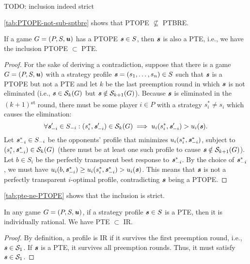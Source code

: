 \begin{remark}
	TODO: inclusion indeed strict
\end{remark}

\begin{remark}
	\autoref{tab:PTOPE-not-sub-sptbre} shows that PTOPE $\not\subseteq$ PTBRE.
\end{remark}

\begin{lemma}
	\label{th:ptope-subset-pte}
	If a game $G = (P, S, \boldsymbol{\mathit{u}})$ has a PTOPE $\boldsymbol{\mathit{s}} \in S$, then $\boldsymbol{\mathit{s}}$ is also a PTE, i.e., we have the inclusion PTOPE $\subset$ PTE.
\end{lemma}

\begin{proof}
	For the sake of deriving a contradiction, suppose that there is a game $G = (P, S, \boldsymbol{\mathit{u}})$ with a strategy profile $\boldsymbol{\mathit{s}} = (s_1, \dots, s_n) \in S$ such that $\boldsymbol{\mathit{s}}$ is a PTOPE but not a PTE and let $k$ be the last preemption round in which $\boldsymbol{\mathit{s}}$ is not eliminated (i.e., $\boldsymbol{\mathit{s}} \in \mathcal{S}_k(G)$ but $\boldsymbol{\mathit{s}} \notin \mathcal{S}_{k+1}(G)$).
	Because $\boldsymbol{\mathit{s}}$ is eliminated in the $(k+1)$\textsuperscript{st} round, there must be some player $i \in P$ with a strategy $s_i^* \ne s_i$ which causes the elimination:
	\[
		\forall \boldsymbol{\mathit{s}}_{-i}' \in S_{-i}: (s_i^*, \boldsymbol{\mathit{s}}_{-i}') \in \mathcal{S}_k(G) \implies u_i(s_i^*, \boldsymbol{\mathit{s}}_{-i}') > u_i(\boldsymbol{\mathit{s}}).
	\]
	Let $\boldsymbol{\mathit{s}}_{-i}^* \in S_{-i}$ be the opponents' profile that minimizes $u_i(s_i^*, \boldsymbol{\mathit{s}}_{-i}^*)$, subject to $(s_i^*, \boldsymbol{\mathit{s}}_{-i}^*)\in \mathcal{S}_k(G)$ (there must be at least one such profile to cause $\boldsymbol{\mathit{s}} \notin \mathcal{S}_{k+1}(G)$).
	Let $b \in S_i$ be the perfectly transparent best response to $\boldsymbol{\mathit{s}}_{-i}^*$.
	By the choice of $\boldsymbol{\mathit{s}}_{-i}^*$, we must have $u_i(b, \boldsymbol{\mathit{s}}_{-i}^*) \ge u_i(s_i^*, \boldsymbol{\mathit{s}}_{-i}^*) > u_i(\boldsymbol{\mathit{s}})$.
	This means that $\boldsymbol{\mathit{s}}$ is not a perfectly transparent $i$-optimal profile, contradicting $\boldsymbol{\mathit{s}}$ being a PTOPE.
\end{proof}

\begin{remark}
	\autoref{tab:pte-ne-PTOPE} shows that the inclusion is strict.
\end{remark}

\begin{observation}
	\label{th:pte-subset-ir}
	In any game $G = (P, S, \boldsymbol{\mathit{u}})$, if a strategy profile $\boldsymbol{\mathit{s}} \in S$ is a PTE, then it is individually rational.
	We have PTE $\subset$ IR.
\end{observation}

\begin{proof}
	By definition, a profile is IR if it survives the first preemption round, i.e., $\boldsymbol{\mathit{s}} \in \mathcal{S}_1$.
	If $\boldsymbol{\mathit{s}}$ is a PTE, it survives all preemption rounds.
	Thus, it must satisfy $\boldsymbol{\mathit{s}} \in \mathcal{S}_1$.
\end{proof}

